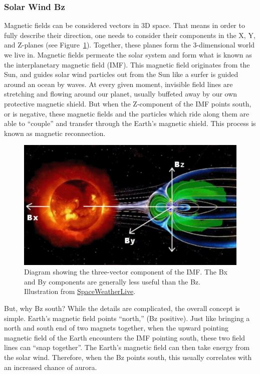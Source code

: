\documentclass{article}
\begin{document}
\subsubsection{Solar Wind Bz}
Magnetic fields can be considered vectors in 3D space. That means in order to fully describe their direction, one needs to consider their components in the X, Y, and Z-planes (see Figure~\ref{fig:bz}). Together, these planes form the 3-dimensional world we live in. Magnetic fields permeate the solar system and form what is known as the interplanetary magnetic field (IMF). This magnetic field originates from the Sun, and guides solar wind particles out from the Sun like a surfer is guided around an ocean by waves. At every given moment, invisible field lines are stretching and flowing around our planet, usually buffeted away by our own protective magnetic shield. But when the Z-component of the IMF points south, or is negative, these magnetic fields and the particles which ride along them are able to ``couple'' and transfer through the Earth's magnetic shield. This process is known as magnetic reconnection. 

\begin{figure}
  \includegraphics[width=\linewidth]{Fig5_IMF.jpg}
  \caption{Diagram showing the three-vector component of the IMF. The Bx and By components are generally less useful than the Bz. Illustration from \href{https://www.spaceweatherlive.com/en/help/the-interplanetary-magnetic-field-imf.html}{SpaceWeatherLive}.}
  \label{fig:bz}
\end{figure}

But, why Bz south? While the details are complicated, the overall concept is simple. Earth's magnetic field points ``north,'' (Bz positive). Just like bringing a north and south end of two magnets together, when the upward pointing magnetic field of the Earth encounters the IMF pointing south, these two field lines can ``snap together''. The Earth's magnetic field can then take energy from the solar wind. Therefore, when the Bz points south, this usually correlates with an increased chance of aurora.
\end{document}
